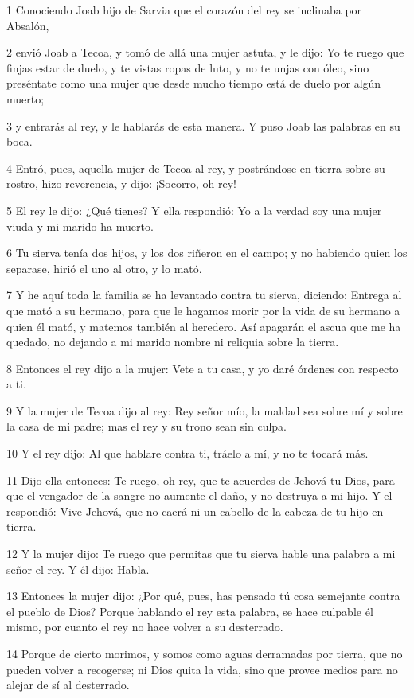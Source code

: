 \par 1 Conociendo Joab hijo de Sarvia que el corazón del rey se inclinaba por Absalón,
\par 2 envió Joab a Tecoa, y tomó de allá una mujer astuta, y le dijo: Yo te ruego que finjas estar de duelo, y te vistas ropas de luto, y no te unjas con óleo, sino preséntate como una mujer que desde mucho tiempo está de duelo por algún muerto;
\par 3 y entrarás al rey, y le hablarás de esta manera. Y puso Joab las palabras en su boca.
\par 4 Entró, pues, aquella mujer de Tecoa al rey, y postrándose en tierra sobre su rostro, hizo reverencia, y dijo: ¡Socorro, oh rey!
\par 5 El rey le dijo: ¿Qué tienes? Y ella respondió: Yo a la verdad soy una mujer viuda y mi marido ha muerto.
\par 6 Tu sierva tenía dos hijos, y los dos riñeron en el campo; y no habiendo quien los separase, hirió el uno al otro, y lo mató. 
\par 7 Y he aquí toda la familia se ha levantado contra tu sierva, diciendo: Entrega al que mató a su hermano, para que le hagamos morir por la vida de su hermano a quien él mató, y matemos también al heredero. Así apagarán el ascua que me ha quedado, no dejando a mi marido nombre ni reliquia sobre la tierra.
\par 8 Entonces el rey dijo a la mujer: Vete a tu casa, y yo daré órdenes con respecto a ti.
\par 9 Y la mujer de Tecoa dijo al rey: Rey señor mío, la maldad sea sobre mí y sobre la casa de mi padre; mas el rey y su trono sean sin culpa.
\par 10 Y el rey dijo: Al que hablare contra ti, tráelo a mí, y no te tocará más.
\par 11 Dijo ella entonces: Te ruego, oh rey, que te acuerdes de Jehová tu Dios, para que el vengador de la sangre no aumente el daño, y no destruya a mi hijo. Y el respondió: Vive Jehová, que no caerá ni un cabello de la cabeza de tu hijo en tierra.
\par 12 Y la mujer dijo: Te ruego que permitas que tu sierva hable una palabra a mi señor el rey. Y él dijo: Habla.
\par 13 Entonces la mujer dijo: ¿Por qué, pues, has pensado tú cosa semejante contra el pueblo de Dios? Porque hablando el rey esta palabra, se hace culpable él mismo, por cuanto el rey no hace volver a su desterrado.
\par 14 Porque de cierto morimos, y somos como aguas derramadas por tierra, que no pueden volver a recogerse; ni Dios quita la vida, sino que provee medios para no alejar de sí al desterrado.
